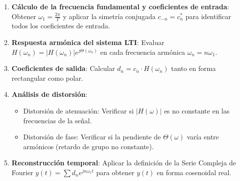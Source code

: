 \begin{mecanizado}
\begin{enumerate}
    \item \textbf{Cálculo de la frecuencia fundamental y coeficientes de entrada}: Obtener $\omega_1 = \frac{2\pi}{T}$ y aplicar la simetría conjugada $c_{-n} = c_n^*$ para identificar todos los coeficientes de entrada.
    \item \textbf{Respuesta armónica del sistema LTI}: Evaluar $H(\omega_n) = \vert{}H(\omega_n)\vert{} e^{j \Theta(\omega_n)}$ en cada frecuencia armónica $\omega_n = n \omega_1$.
    \item \textbf{Coeficientes de salida}: Calcular $d_n = c_n \cdot H(\omega_n)$ tanto en forma rectangular como polar.
    \item \textbf{Análisis de distorsión}:
    \begin{itemize}
        \item Distorsión de atenuación: Verificar si $\vert{}H(\omega)\vert{}$ es no constante en las frecuencias de la señal.
        \item Distorsión de fase: Verificar si la pendiente de $\Theta(\omega)$ varía entre armónicos (retardo de grupo no constante).
    \end{itemize}
    \item \textbf{Reconstrucción temporal}: Aplicar la definición de la Serie Compleja de Fourier $y(t) = \sum d_n e^{j n \omega_1 t}$ para obtener $y(t)$ en forma cosenoidal real.
\end{enumerate}
\end{mecanizado}

